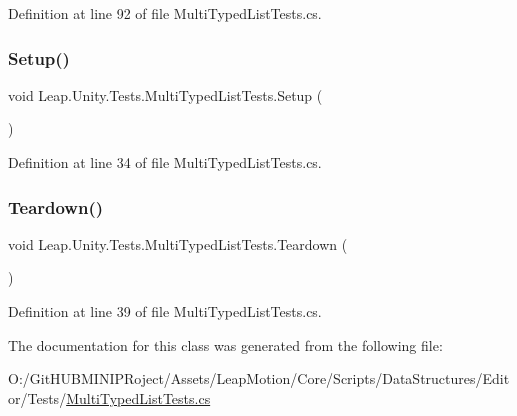 Definition at line 92 of file Multi\+Typed\+List\+Tests.\+cs.

\mbox{\label{class_leap_1_1_unity_1_1_tests_1_1_multi_typed_list_tests_a27a72c13752661f9add82375dcc06830}} 
\subsubsection{\texorpdfstring{Setup()}{Setup()}}
{\footnotesize\ttfamily void Leap.\+Unity.\+Tests.\+Multi\+Typed\+List\+Tests.\+Setup (\begin{DoxyParamCaption}{ }\end{DoxyParamCaption})}



Definition at line 34 of file Multi\+Typed\+List\+Tests.\+cs.

\mbox{\label{class_leap_1_1_unity_1_1_tests_1_1_multi_typed_list_tests_abb37d7aef9813348c4dc7a8628570e44}} 
\subsubsection{\texorpdfstring{Teardown()}{Teardown()}}
{\footnotesize\ttfamily void Leap.\+Unity.\+Tests.\+Multi\+Typed\+List\+Tests.\+Teardown (\begin{DoxyParamCaption}{ }\end{DoxyParamCaption})}



Definition at line 39 of file Multi\+Typed\+List\+Tests.\+cs.



The documentation for this class was generated from the following file\+:\begin{DoxyCompactItemize}
\item 
O\+:/\+Git\+H\+U\+B\+M\+I\+N\+I\+P\+Roject/\+Assets/\+Leap\+Motion/\+Core/\+Scripts/\+Data\+Structures/\+Editor/\+Tests/\mbox{\hyperlink{_multi_typed_list_tests_8cs}{Multi\+Typed\+List\+Tests.\+cs}}\end{DoxyCompactItemize}
